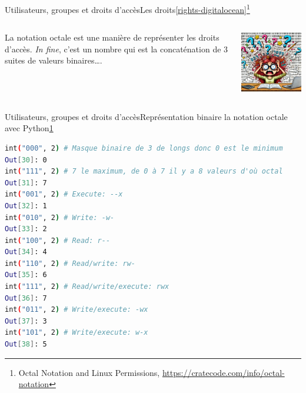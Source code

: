\documentclass{beamer}
\begin{document}
    \begin{frame}{Utilisateurs, groupes et droits d'accès}{Les droits\cref{rights-digitalocean}\footnotestep\footnote{\label{octal}Octal Notation and Linux Permissions, \url{https://cratecode.com/info/octal-notation}}}
        \begin{columns}
            La notation octale est une manière de représenter les droits d'accès.
            \bigbreak
            \textit{In fine}, c'est un nombre qui est la concaténation de 3 suites de valeurs binaires\ldots.
            \begin{center}
                \includegraphics[width=6.5cm]{image/binary-explosion}
            \end{center}
        \end{columns}
    \end{frame}

    \begin{frame}[fragile]{Utilisateurs, groupes et droits d'accès}{Représentation binaire la notation octale avec Python\cref{octal}}
        \begin{lstlisting}[language=bash]
int("000", 2) # Masque binaire de 3 de longs donc 0 est le minimum
Out[30]: 0
int("111", 2) # 7 le maximum, de 0 à 7 il y a 8 valeurs d'où octal
Out[31]: 7
int("001", 2) # Execute: --x
Out[32]: 1
int("010", 2) # Write: -w-
Out[33]: 2
int("100", 2) # Read: r--
Out[34]: 4
int("110", 2) # Read/write: rw-
Out[35]: 6
int("111", 2) # Read/write/execute: rwx
Out[36]: 7
int("011", 2) # Write/execute: -wx
Out[37]: 3
int("101", 2) # Write/execute: w-x
Out[38]: 5
        \end{lstlisting}
    \end{frame}
\end{document}
